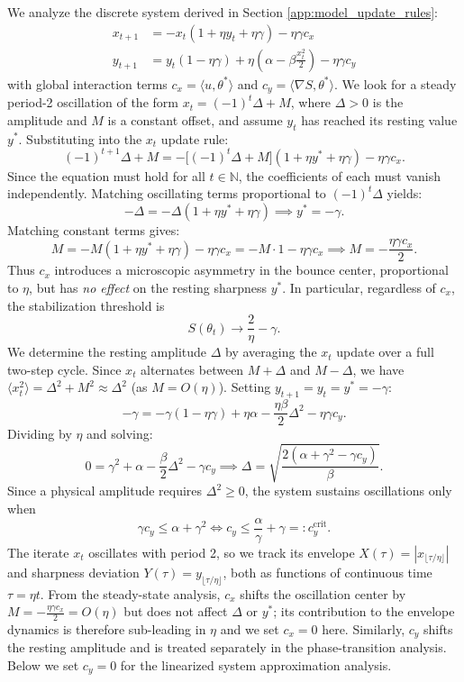 \documentclass{article}
\begin{document}
We analyze the discrete system derived in Section \ref{app:model_update_rules}:
\begin{align*}
    x_{t+1} &= -x_t(1 + \eta y_t + \eta\gamma) - \eta\gamma c_x \\
    y_{t+1} &= y_t(1 - \eta\gamma) + \eta\!\left(\alpha - \beta\frac{x_t^2}{2}\right) - \eta\gamma c_y
\end{align*}
with global interaction terms $c_x = \langle u, \theta^*\rangle$ and $c_y = \langle \nabla S, \theta^*\rangle$. We look for a steady period-2 oscillation of the form $x_t = (-1)^t \Delta + M$, where $\Delta > 0$ is the amplitude and $M$ is a constant offset, and assume $y_t$ has reached its resting value $y^*$. Substituting into the $x_t$ update rule:
\[
    (-1)^{t+1}\Delta + M
    = -\bigl[(-1)^t \Delta + M\bigr](1 + \eta y^* + \eta\gamma) - \eta\gamma c_x.
\]
Since the equation must hold for all $t \in \mathbb{N}$, the coefficients of each must vanish independently. Matching oscillating terms proportional to $(-1)^t \Delta$ yields:
\[
    -\Delta = -\Delta(1 + \eta y^* + \eta\gamma)
    \implies
    y^* = -\gamma.
\]
Matching constant terms gives:
\[
    M = -M(1 + \eta y^* + \eta\gamma) - \eta\gamma c_x
    = -M \cdot 1 - \eta\gamma c_x
    \implies
    M = -\frac{\eta\gamma c_x}{2}.
\]
Thus $c_x$ introduces a microscopic asymmetry in the bounce center, proportional to $\eta$, but has \emph{no effect} on the resting sharpness $y^*$. In particular, regardless of $c_x$, the stabilization threshold is
\[
    S(\theta_t) \to \frac{2}{\eta} - \gamma.
\]
We determine the resting amplitude $\Delta$ by averaging the $x_t$ update over a full two-step cycle. Since $x_t$ alternates between $M + \Delta$ and $M - \Delta$, we have $\langle x_t^2 \rangle = \Delta^2 + M^2 \approx \Delta^2$ (as $M = O(\eta)$). Setting $y_{t+1} = y_t = y^* = -\gamma$:
\[
    -\gamma = -\gamma(1-\eta\gamma) + \eta\alpha - \frac{\eta\beta}{2}\Delta^2 - \eta\gamma c_y.
\]
Dividing by $\eta$ and solving:
\[
    0 = \gamma^2 + \alpha - \frac{\beta}{2}\Delta^2 - \gamma c_y
    \implies
    \Delta = \sqrt{\frac{2(\alpha + \gamma^2 - \gamma c_y)}{\beta}}.
\]
Since a physical amplitude requires $\Delta^2 \geq 0$, the system sustains oscillations only when
\[
    \gamma c_y \leq \alpha + \gamma^2
    \iff
    c_y \leq \frac{\alpha}{\gamma} + \gamma =: c_y^{\mathrm{crit}}.
\]
The iterate $x_t$ oscillates with period 2, so we track its envelope $X(\tau) = |x_{\lfloor \tau/\eta \rfloor}|$ and sharpness deviation $Y(\tau) = y_{\lfloor \tau/\eta \rfloor}$, both as functions of continuous time $\tau = \eta t$. From the steady-state analysis, $c_x$ shifts the oscillation center by $M = -\frac{\eta\gamma c_x}{2} = O(\eta)$ but does not affect $\Delta$ or $y^*$; its contribution to the envelope dynamics is therefore sub-leading in $\eta$ and we set $c_x = 0$ here. Similarly, $c_y$ shifts the resting amplitude and is treated separately in the phase-transition analysis. Below we set $c_y = 0$ for the linearized system approximation analysis.
\end{document}
